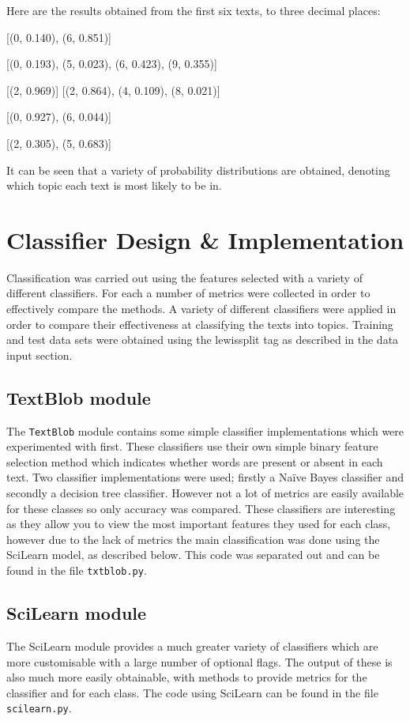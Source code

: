 \documentclass{article}
\begin{document}
Here are the results obtained from the first six texts, to three decimal places:

[(0, 0.140), (6, 0.851)]

[(0, 0.193), (5, 0.023), (6, 0.423), (9, 0.355)]

[(2, 0.969)]
[(2, 0.864), (4, 0.109), (8, 0.021)]

[(0, 0.927), (6, 0.044)]

[(2, 0.305), (5, 0.683)]

It can be seen that a variety of probability distributions are obtained, denoting which topic each text is most likely to be in.

\section{Classifier Design \& Implementation}
Classification was carried out using the features selected with a variety of different classifiers. For each a number of metrics were collected in order to effectively compare the methods. A variety of different classifiers were applied in order to compare their effectiveness at classifying the texts into topics. Training and test data sets were obtained using the lewissplit tag as described in the data input section.

\subsection{TextBlob module}
The \verb|TextBlob| module contains some simple classifier implementations which were experimented with first. These classifiers use their own simple binary feature selection method which indicates whether words are present or absent in each text. Two classifier implementations were used; firstly a Na{\"i}ve Bayes classifier and secondly a decision tree classifier. However not a lot of metrics are easily available for these classes so only accuracy was compared. These classifiers are interesting as they allow you to view the most important features they used for each class, however due to the lack of metrics the main classification was done using the SciLearn model, as described below. This code was separated out and can be found in the file \verb|txtblob.py|.

\subsection{SciLearn module}
The SciLearn module provides a much greater variety of classifiers which are more customisable with a large number of optional flags. The output of these is also much more easily obtainable, with methods to provide metrics for the classifier and for each class. The code using SciLearn can be found in the file \verb|scilearn.py|.
\end{document}
